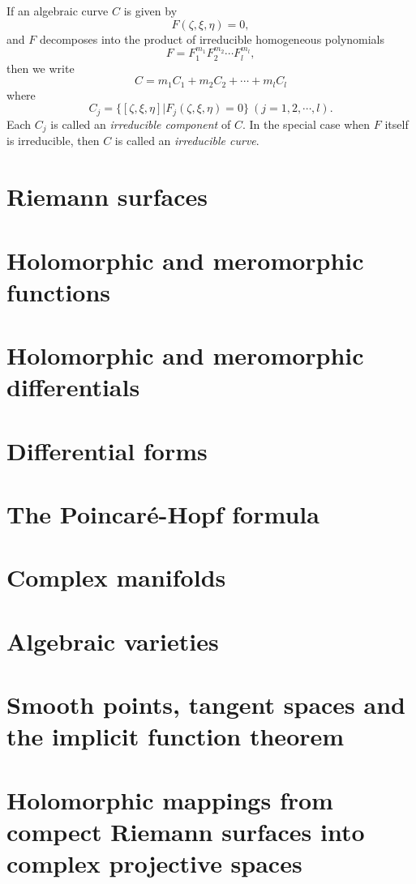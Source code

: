 If an algebraic curve $C$ is given by 
$$F(\zeta,\xi,\eta)=0, $$
and $F$ decomposes into the product of irreducible homogeneous polynomials 
$$F=F_1^{m_1}F_2^{m_2}\cdots F_l^{m_l}, $$
then we write 
$$C=m_1C_1+m_2C_2+\cdots+m_lC_l$$
where 
$$C_j=\{[\zeta,\xi,\eta]|F_j(\zeta,\xi,\eta)=0\}\ (j=1,2,\cdots,l). $$
Each $C_j$ is called an \textit{irreducible component} of $C$. In the special case when $F$ itself is irreducible, then $C$ is called an \textit{irreducible curve}. 

\section{Riemann surfaces}\label{s1.2}


\section{Holomorphic and meromorphic functions}\label{s1.3}

\section{Holomorphic and meromorphic differentials}\label{s1.4}

\section{Differential forms}\label{s1.5}

\section{The Poincar\'e-Hopf formula}\label{s1.6}

\section{Complex manifolds}\label{s1.7}

\section{Algebraic varieties}\label{s1.8}

\section{Smooth points, tangent spaces and the implicit function theorem}\label{s1.9}

\section{Holomorphic mappings from compect Riemann surfaces into complex projective spaces}\label{s1.10}
